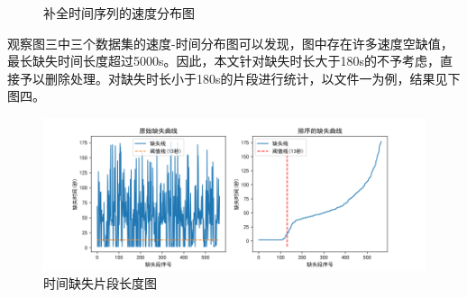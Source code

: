 \documentclass[bwprint]{gmcmthesis}
\begin{document}
\begin{figure}[htbp] %
\centering
{}

\caption{补全时间序列的速度分布图}
\label{f3}
\end{figure}

观察图三中三个数据集的速度-时间分布图可以发现，图中存在许多速度空缺值，最长缺失时间长度超过5000s。因此，本文针对缺失时长大于180s的不予考虑，直接予以删除处理。对缺失时长小于180s的片段进行统计，以文件一为例，结果见下图四。
\begin{figure}[htbp] %
\centering
\includegraphics[width=0.9\linewidth,angle=0]{figures/data1-lack-map-curve.png}
\caption{时间缺失片段长度图}
\label{f4}
\end{figure}
\end{document}
